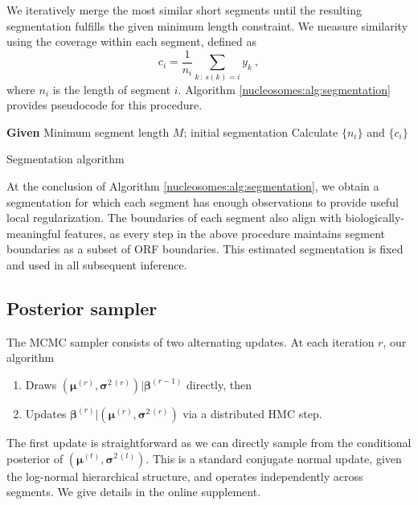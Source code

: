 We iteratively merge the most similar short segments until the resulting segmentation fulfills the given minimum length constraint.
We measure similarity using the coverage within each segment, defined as
\begin{equation}
 c_i = \frac{1}{n_i} \sum_{k \,:\, s(k)=i} y_k \ ,
\end{equation}
where $n_i$ is the length of segment $i$.
Algorithm \ref{nucleosomes:alg:segmentation} provides pseudocode for this procedure.

\begin{algorithm}
  \textbf{Given} Minimum segment length $M$; initial segmentation\;
  Calculate $\{n_i\}$ and $\{c_i\}$\;
  \medskip
  \caption{Segmentation algorithm \label{nucleosomes:alg:segmentation}}
\end{algorithm}

At the conclusion of Algorithm \ref{nucleosomes:alg:segmentation}, we obtain a segmentation for which each segment has enough observations to provide useful local regularization.
The boundaries of each segment also align with biologically-meaningful features, as every step in the above procedure maintains segment boundaries as a subset of ORF boundaries.
This estimated segmentation is fixed and used in all subsequent inference.

\subsection{Posterior sampler}
\label{nucleosomes:sec:mcmc}

The MCMC sampler consists of two alternating updates.
At each iteration $r$, our algorithm
\begin{enumerate}
 \item Draws $(\bm \mu^{(r)}, \bm \sigma^{2\,(r)}) | \bm \beta^{(r-1)}$ directly, then
 \item Updates $\bm \beta^{(r)} | (\bm \mu^{(r)}, \bm \sigma^{2\,(r)})$ via a distributed HMC step.
\end{enumerate}
The first update is straightforward as we can directly sample from the conditional posterior of $(\bm \mu^{(t)}, \bm \sigma^{2\,(t)})$.
This is a standard conjugate normal update, given the log-normal hierarchical structure, and operates independently across segments.
We give details in the online supplement. %

